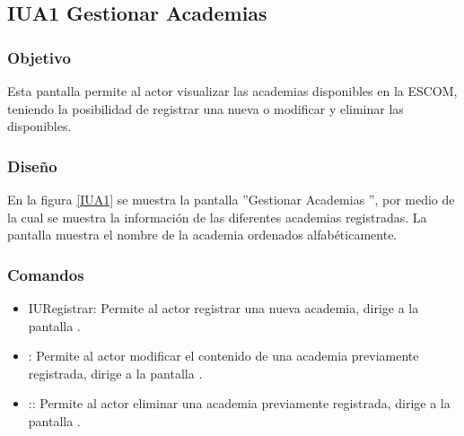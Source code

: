 \subsection{IUA1 Gestionar Academias}

\subsubsection{Objetivo}
	
Esta pantalla permite al actor visualizar las academias disponibles en la ESCOM, teniendo la posibilidad de registrar una nueva o modificar y eliminar las disponibles.

\subsubsection{Diseño}

    En la figura \ref{IUA1} se muestra la pantalla ''Gestionar Academias '', por medio de la cual se muestra la información de las diferentes academias registradas. La pantalla muestra el nombre de la academia ordenados alfabéticamente.
 

\subsubsection{Comandos}
    \begin{itemize}
	\item IURegistrar: Permite al actor registrar una nueva academia, dirige a la pantalla .
	
	\item {}: Permite al actor modificar el contenido de una academia previamente registrada, dirige a la pantalla .
	
	\item {}:: Permite al actor eliminar una academia previamente registrada, dirige a la pantalla .
    \end{itemize}
